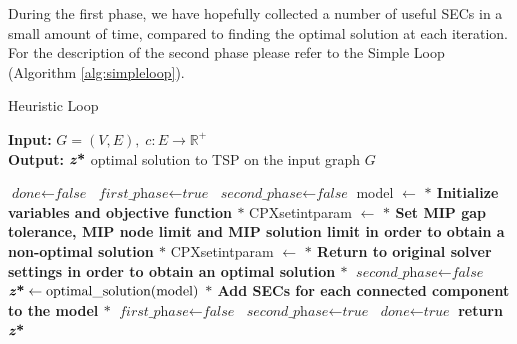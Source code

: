 During the first phase, we have hopefully collected a number of useful SECs in a small amount of time, compared to finding the optimal solution at each iteration.
For the description of the second phase please refer to the Simple Loop (Algorithm \ref{alg:simpleloop}).
\begin{algorithm}
    \caption{Heuristic Loop}\label{Loop Method}
    \hspace*{\algorithmicindent} \textbf{Input:} $G = (V,E) , \; c : E \rightarrow \mathbb{R}^+$\\
    \hspace*{\algorithmicindent} \textbf{Output:} $\textbf{\textit{z}\text{*}} $ optimal solution to TSP on the input graph $G$
    \begin{algorithmic}[1]
    \State $\textit{done} \gets \textit{false}$
    \State $\textit{first\_phase} \gets \textit{true}$
    \State $\textit{second\_phase} \gets \textit{false}$
    \State model $ \leftarrow $ \textbf{$\ast$ Initialize variables and objective function $\ast$ }
    \State CPXsetintparam $ \leftarrow $ \textbf{$\ast$ Set MIP gap tolerance, MIP node limit and MIP solution limit in order to obtain a non-optimal solution $\ast$ }
	\State CPXsetintparam $ \leftarrow $\textbf{ $\ast$ Return to original solver settings in order to obtain an optimal solution $\ast$ }
	\State $\textit{second\_phase} \gets \textit{false}$
	\EndIf
    	\State $\textbf{\textit{z}\text{*}}  \gets \text{optimal\_solution}(\text{model})$\;
	\State \textbf{ $\ast$ Add SECs for each connected component to the model $\ast$ }
	\EndIf
	\State $\textit{first\_phase} \gets \textit{false}$
	\State $\textit{second\_phase} \gets \textit{true}$
	\EndIf
	\State $\textit{done} \gets \textit{true}$
	\EndIf
    \EndWhile
    \State \textbf{return} $\textbf{\textit{z}\text{*}} $
    \end{algorithmic}
    \label{alg:heuloop}
    \end{algorithm}
    
\newpage
